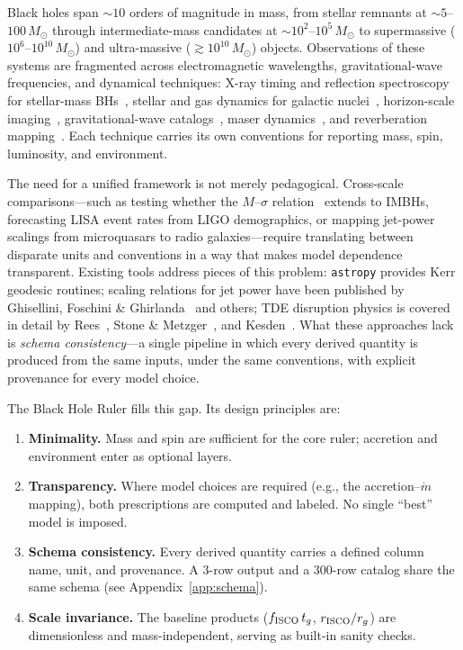 \documentclass[11pt]{article}
\begin{document}
Black holes span $\sim 10$ orders of magnitude in mass, from stellar remnants at $\sim 5$--$100\,M_\odot$ through intermediate-mass candidates at $\sim 10^{2}$--$10^{5}\,M_\odot$ to supermassive ($10^{6}$--$10^{10}\,M_\odot$) and ultra-massive ($\gtrsim 10^{10}\,M_\odot$) objects.
Observations of these systems are fragmented across electromagnetic wavelengths, gravitational-wave frequencies, and dynamical techniques: X-ray timing and reflection spectroscopy for stellar-mass BHs~\cite{MillerJones2021,Zhao2021}, stellar and gas dynamics for galactic nuclei~\cite{Gravity2020,KormendyHo2013}, horizon-scale imaging~\cite{EHT2019M87I,EHT2022SgrA1,EHT2021M87Pol}, gravitational-wave catalogs~\cite{GWTC3_2023}, maser dynamics~\cite{Kuo2011}, and reverberation mapping~\cite{Peterson2014}.
Each technique carries its own conventions for reporting mass, spin, luminosity, and environment.

The need for a unified framework is not merely pedagogical.
Cross-scale comparisons---such as testing whether the $M$--$\sigma$ relation~\cite{FerrareseMerritt2000,Gebhardt2000} extends to IMBHs, forecasting LISA event rates from LIGO demographics, or mapping jet-power scalings from microquasars to radio galaxies---require translating between disparate units and conventions in a way that makes model dependence transparent.
Existing tools address pieces of this problem: \texttt{astropy} provides Kerr geodesic routines; scaling relations for jet power have been published by Ghisellini, Foschini \& Ghirlanda~\cite{GhiselliniFoschiniGhirlanda2005} and others; TDE disruption physics is covered in detail by Rees~\cite{Rees1988}, Stone \& Metzger~\cite{Stone2016}, and Kesden~\cite{Kesden2012}.
What these approaches lack is \emph{schema consistency}---a single pipeline in which every derived quantity is produced from the same inputs, under the same conventions, with explicit provenance for every model choice.

The Black Hole Ruler fills this gap.
Its design principles are:
\begin{enumerate}
\item \textbf{Minimality.} Mass and spin are sufficient for the core ruler; accretion and environment enter as optional layers.
\item \textbf{Transparency.} Where model choices are required (e.g., the accretion--$\dot{m}$ mapping), both prescriptions are computed and labeled. No single ``best'' model is imposed.
\item \textbf{Schema consistency.} Every derived quantity carries a defined column name, unit, and provenance. A 3-row output and a 300-row catalog share the same schema (see Appendix~\ref{app:schema}).
\item \textbf{Scale invariance.} The baseline products ($f_{\rm ISCO}\,t_g$, $r_{\rm ISCO}/r_g$) are dimensionless and mass-independent, serving as built-in sanity checks.
\end{enumerate}
\end{document}
